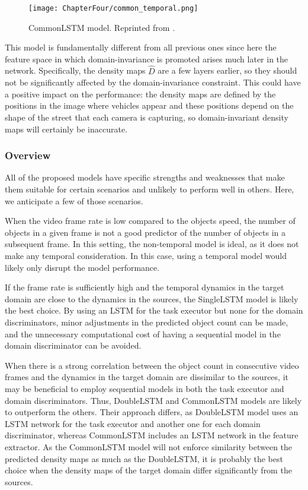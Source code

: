 \begin{figure}[!ht]
    \centering
    \texttt{[image: ChapterFour/common\_temporal.png]}
    \caption{CommonLSTM model. Reprinted from \citet{ThesisFrancisco}.}
    \label{fig:common_temporal_model}
\end{figure}

This model is fundamentally different from all previous ones since here the feature space in which domain-invariance is promoted arises much later in the network. Specifically, the density maps $\widehat{D}$ are a few layers earlier, so they should not be significantly affected by the domain-invariance constraint. This could have a positive impact on the performance: the density maps are defined by the positions in the image where vehicles appear and these positions depend on the shape of the street that each camera is capturing, so domain-invariant density maps will certainly be inaccurate.

\subsubsection{Overview}

All of the proposed models have specific strengths and weaknesses that make them suitable for certain scenarios and unlikely to perform well in others. Here, we anticipate a few of those scenarios.

When the video frame rate is low compared to the objects speed, the number of objects in a given frame is not a good predictor of the number of objects in a subsequent frame. In this setting, the non-temporal model is ideal, as it does not make any temporal consideration. In this case, using a temporal model would likely only disrupt the model performance.

If the frame rate is sufficiently high and the temporal dynamics in the target domain are close to the dynamics in the sources, the SingleLSTM model is likely the best choice. By using an LSTM for the task executor but none for the domain discriminators, minor adjustments in the predicted object count can be made, and the unnecessary computational cost of having a sequential model in the domain discriminator can be avoided.

When there is a strong correlation between the object count in consecutive video frames and the dynamics in the target domain are dissimilar to the sources, it may be beneficial to employ sequential models in both the task executor and domain discriminators. Thus, DoubleLSTM and CommonLSTM models are likely to outperform the others. Their approach differs, as DoubleLSTM model uses an LSTM network for the task executor and another one for each domain discriminator, whereas CommonLSTM includes an LSTM network in the feature extractor. As the CommonLSTM model will not enforce similarity between the predicted density maps as much as the DoubleLSTM, it is probably the best choice when the density maps of the target domain differ significantly from the sources.

